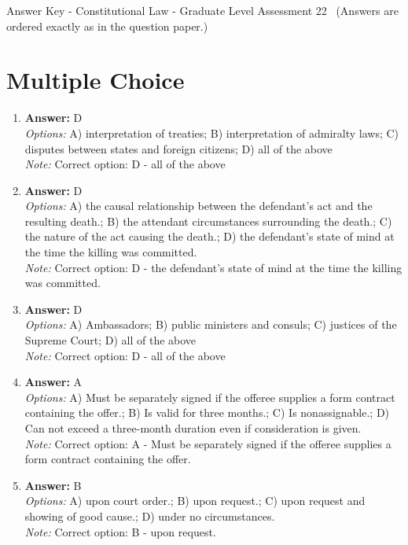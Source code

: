 \documentclass[12pt]{article}
\begin{document}
\begin{center}
Answer Key - Constitutional Law - Graduate Level Assessment 22 \
\small (Answers are ordered exactly as in the question paper.)
\end{center}

\section*{Multiple Choice}
\begin{enumerate}[label=\arabic*.]
\item \textbf{Answer:} D
\\ \textit{Options:} A) interpretation of treaties; B) interpretation of admiralty laws; C) disputes between states and foreign citizens; D) all of the above
\\ \textit{Note:} Correct option: D - all of the above
\item \textbf{Answer:} D
\\ \textit{Options:} A) the causal relationship between the defendant's act and the resulting death.; B) the attendant circumstances surrounding the death.; C) the nature of the act causing the death.; D) the defendant's state of mind at the time the killing was committed.
\\ \textit{Note:} Correct option: D - the defendant's state of mind at the time the killing was committed.
\item \textbf{Answer:} D
\\ \textit{Options:} A) Ambassadors; B) public ministers and consuls; C) justices of the Supreme Court; D) all of the above
\\ \textit{Note:} Correct option: D - all of the above
\item \textbf{Answer:} A
\\ \textit{Options:} A) Must be separately signed if the offeree supplies a form contract containing the offer.; B) Is valid for three months.; C) Is nonassignable.; D) Can not exceed a three-month duration even if consideration is given.
\\ \textit{Note:} Correct option: A - Must be separately signed if the offeree supplies a form contract containing the offer.
\item \textbf{Answer:} B
\\ \textit{Options:} A) upon court order.; B) upon request.; C) upon request and showing of good cause.; D) under no circumstances.
\\ \textit{Note:} Correct option: B - upon request.
\end{enumerate}
\end{document}
